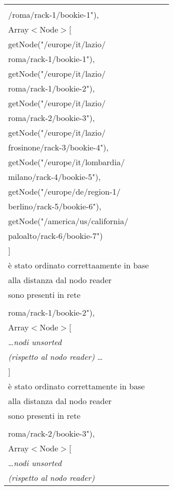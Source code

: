 \documentclass[10pt, a4paper]{article}
\newcommand{\Intmaketable}[4]{
	\begin{longtable}{#3}
	#4
	\caption{#2}
	\label{#1}
	\end{longtable}
}
\newcommand{\Inttestctable}[3]{
	\Intmaketable{#1}{#2}{|l|l|l|}{
	\hline
	\thead{Input} & \thead{Esito atteso} & \thead{Motivazione}\\
	\hline
	\hline
	#3
	\hline}
}
\newcommand{\Inttestccaption}[4]{Casi di test per metodo #1 di #2, iter. #3 (#4)}
\newcommand{\gettablelabel}[5]{table:#1:#2:#3:iter#4:proj#5}
\newcommand{\testctable}[5]{
	\Inttestctable{\gettablelabel{testc}{#1}{#2}{#3}{#4}}
		{\Inttestccaption{#1}{#2}{#3}{#4}}
		{#5}
}
\newcommand{\tcell}{\makecell[tl]}
\newcommand{\newtrow}{\\ \hline}
\def\bookkeeper{BookKeeper}
\begin{document}
	\testctable{pseudoSortByDistance}{NetworkTopologyImpl}{2}{\bookkeeper}{
			\tcell{getNode("/europe/it/lazio\\/roma/rack-1/bookie-1"),\\
				Array$<$Node$>$[\\
					\;\;getNode("/europe/it/lazio/\\roma/rack-1/bookie-1"),\\
					\;\;getNode("/europe/it/lazio/\\roma/rack-1/bookie-2"),\\
					\;\;getNode("/europe/it/lazio/\\roma/rack-2/bookie-3"),\\
					\;\;getNode("/europe/it/lazio/\\frosinone/rack-3/bookie-4"),\\
					\;\;getNode("/europe/it/lombardia/\\milano/rack-4/bookie-5"),\\
					\;\;getNode("/europe/de/region-1/\\berlino/rack-5/bookie-6"),\\
					\;\;getNode("/america/us/california/\\paloalto/rack-6/bookie-7")
					\\]} &
			\tcell{L'array passato (by reference) \\
			è stato ordinato correttaamente in base\\
			 alla distanza dal nodo reader} &
			\tcell{Tutti i nodi (reader e nell'array)\\ sono presenti in rete}
		\newtrow
			\tcell{getNode("/europe/it/lazio/\\roma/rack-1/bookie-2"),\\
				Array$<$Node$>$[\\
					\;\;\dots \textit{nodi unsorted} \\ \textit{(rispetto al nodo reader)}
					\dots \\
				]} &
			\tcell{L'array passato (by reference) \\
			è stato ordinato correttamente in base\\
			alla distanza dal nodo reader} &
			\tcell{Tutti i nodi (reader e nell'array)\\ sono presenti in rete}
		\newtrow
			\tcell{getNode("/europe/it/lazio/\\roma/rack-2/bookie-3"),\\
				Array$<$Node$>$[\\
					\;\;\dots \textit{nodi unsorted} \\ \textit{(rispetto al nodo reader)}
}}
\end{document}
